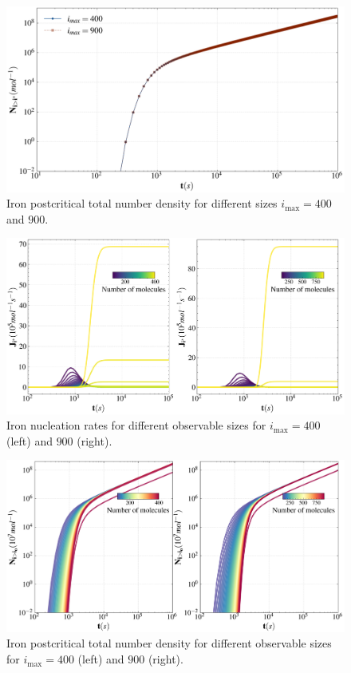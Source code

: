 \begin{figure}[H]
    \centering
    \includegraphics[width=1.1\linewidth]{postcritical_number_fe.png}
    \caption{Iron postcritical total number density for different sizes $i_{\text{max}} = 400$ and $900$.}
    \label{fig:postcritical_number_fe}
\end{figure}

\begin{figure}[H]
    \centering
    \includegraphics[width=1.1\linewidth]{postcritical_nucleation_rate_fe_particles_comparison.png}
    \caption{Iron nucleation rates for different observable sizes for $i_{\text{max}} = 400$ (left) and $900$ (right).}
    \label{fig:postcritical_nucleation_rate_fe_particles_comparison}
\end{figure}

\begin{figure}[H]
    \centering
    \includegraphics[width=1.1\linewidth]{postcritical_number_density_fe_particles_comparison.png}
    \caption{Iron postcritical total number density for different observable sizes for $i_{\text{max}} = 400$ (left) and $900$ (right).}
    \label{fig:postcritical_number_density_fe_particles_comparison}
\end{figure}


